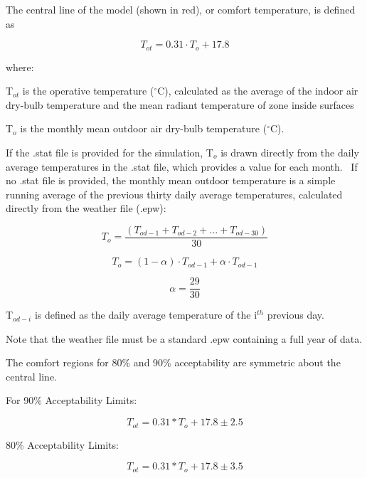 The central line of the model (shown in red), or comfort temperature, is defined as

\begin{equation}
{T_{ot}} = 0.31\cdot {T_o} + 17.8
\end{equation}

where:

T\(_{ot}\) is the operative temperature (\(^{\circ}\)C), calculated as the average of the indoor air dry-bulb temperature and the mean radiant temperature of zone inside surfaces

T\(_{o}\) is the monthly mean outdoor air dry-bulb temperature (\(^{\circ}\)C).

If the .stat file is provided for the simulation, T\(_{o}\) is drawn directly from the daily average temperatures in the .stat file, which provides a value for each month.~ If no .stat file is provided, the monthly mean outdoor temperature is a simple running average of the previous thirty daily average temperatures, calculated directly from the weather file (.epw):

\begin{equation}
{T_o} = \frac{{\left( {{T_{od - 1}} + {T_{od - 2}} + ... + {T_{od - 30}}} \right)}}{{30}}
\end{equation}

\begin{equation}
{T_o} = (1 - \alpha )\cdot {T_{od - 1}} + \alpha \cdot {T_{od - 1}}
\end{equation}

\begin{equation}
\alpha  = \frac{{29}}{{30}}
\end{equation}

T\(_{od-i}\) is defined as the daily average temperature of the i\(^{th}\) previous day.

Note that the weather file must be a standard .epw containing a full year of data.

The comfort regions for 80\% and 90\% acceptability are symmetric about the central line.

For 90\% Acceptability Limits:

\begin{equation}
T_{ot} = 0.31* T_{o} + 17.8 ± 2.5
\end{equation}

80\% Acceptability Limits:

\begin{equation}
T_{ot} = 0.31* T_{o} + 17.8 ± 3.5
\end{equation}

